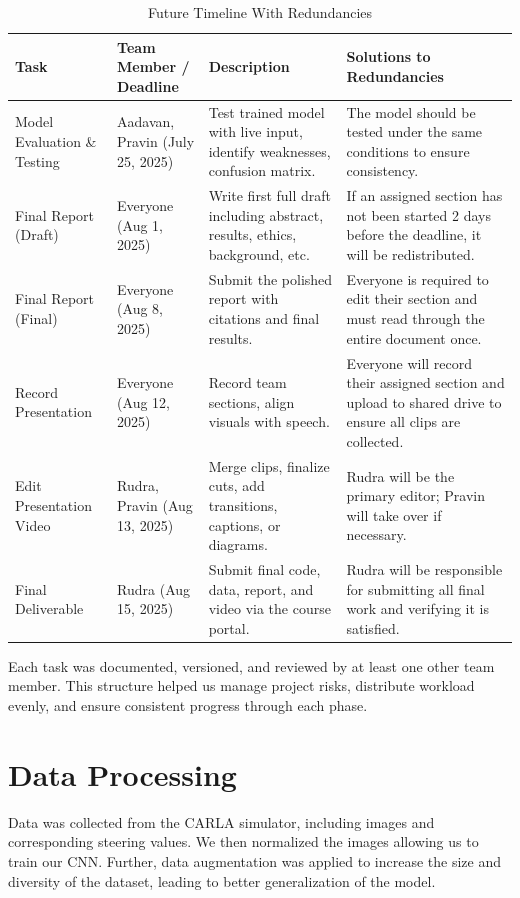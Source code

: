 \documentclass{article} %
\begin{document}
\begin{table}[h!]
\centering
\caption{Future Timeline With Redundancies}
\begin{tabular}{|p{2.5cm}|p{4cm}|p{4cm}|p{4cm}|}
\hline
\textbf{Task} & \textbf{Team Member / Deadline} & \textbf{Description} & \textbf{Solutions to Redundancies} \\
\hline
Model Evaluation \& Testing & Aadavan, Pravin (July 25, 2025) & Test trained model with live input, identify weaknesses, confusion matrix. & The model should be tested under the same conditions to ensure consistency. \\
\hline
Final Report (Draft) & Everyone (Aug 1, 2025) & Write first full draft including abstract, results, ethics, background, etc. & If an assigned section has not been started 2 days before the deadline, it will be redistributed. \\
\hline
Final Report (Final) & Everyone (Aug 8, 2025) & Submit the polished report with citations and final results. & Everyone is required to edit their section and must read through the entire document once. \\
\hline
Record Presentation & Everyone (Aug 12, 2025) & Record team sections, align visuals with speech. & Everyone will record their assigned section and upload to shared drive to ensure all clips are collected. \\
\hline
Edit Presentation Video & Rudra, Pravin (Aug 13, 2025) & Merge clips, finalize cuts, add transitions, captions, or diagrams. & Rudra will be the primary editor; Pravin will take over if necessary. \\
\hline
Final Deliverable & Rudra (Aug 15, 2025) & Submit final code, data, report, and video via the course portal. & Rudra will be responsible for submitting all final work and verifying it is satisfied. \\
\hline
\end{tabular}
\label{tab:futureTimeline}
\end{table}

Each task was documented, versioned, and reviewed by at least one other team member. This structure helped us manage project risks, distribute workload evenly, and ensure consistent progress through each phase.

\section{Data Processing}

Data was collected from the CARLA simulator, including images and corresponding steering values. We then normalized the images allowing us to train our CNN.
Further, data augmentation was applied to increase the size and diversity of the dataset, leading to better generalization of the model.
\end{document}
